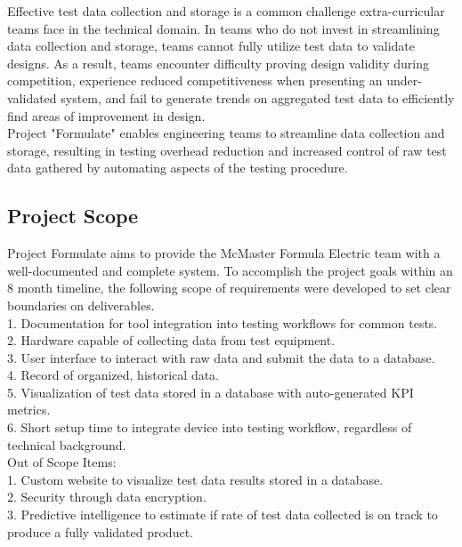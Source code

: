 \documentclass[12pt]{article}
\begin{document}
Effective test data collection and storage is a common challenge extra-curricular teams face in the technical domain. In teams who do not invest in streamlining data collection and storage, teams cannot fully utilize test data to validate designs. As a result, teams encounter difficulty proving design validity during competition, experience reduced competitiveness when presenting an under-validated system, and fail to generate trends on aggregated test data to efficiently find areas of improvement in design. \\

Project "Formulate" enables engineering teams to streamline data collection and storage, resulting in testing overhead reduction and increased control of raw test data gathered by automating aspects of the testing procedure.\\

\subsection{Project Scope}

Project Formulate aims to provide the McMaster Formula Electric team with a well-documented and complete system. To accomplish the project goals within an 8 month timeline, the following scope of requirements were developed to set clear boundaries on deliverables.\\

1. Documentation for tool integration into testing workflows for common tests.\\
2. Hardware capable of collecting data from test equipment.\\
3. User interface to interact with raw data and submit the data to a database.\\
4. Record of organized, historical data.\\
5. Visualization of test data stored in a database with auto-generated KPI metrics.\\
6. Short setup time to integrate device into testing workflow, regardless of technical background.\\

  Out of Scope Items:\\
1. Custom website to visualize test data results stored in a database.\\
2. Security through data encryption.\\
3. Predictive intelligence to estimate if rate of test data collected is on track to produce a fully validated product.\\
\end{document}
